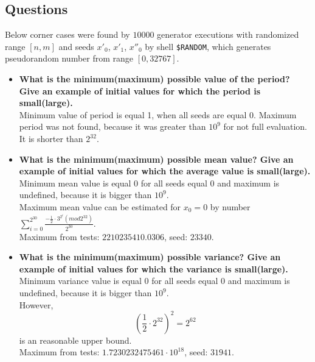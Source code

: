 \documentclass[a4paper,10pt]{article}
\begin{document}
\subsection{Questions}
Below corner cases were found by $10000$ generator executions with randomized range $[n,m]$ and seeds ${x'_0}$, ${x'_1}$, ${x''_0}$ by shell \texttt{\$RANDOM}, which generates pseudorandom number from range $[0,32767]$.
\begin{itemize}
 \item \textbf{What is the minimum(maximum) possible value of the period? Give an example of initial values for which the period is small(large).} \\ 
Minimum value of period is equal 1, when all seeds are equal 0. Maximum period was not found, because it was greater than $10^9$ for not full evaluation. It is shorter than $2^32$.
 \item \textbf{What is the minimum(maximum) possible mean value? Give an example of initial values for which the average value is small(large).} \\
Minimum mean value is equal 0 for all seeds equal 0 and maximum is undefined, because it is bigger than $10^9$. \\
Maximum mean value can be estimated for $x_0 = 0$ by number $\sum_{i=0}^{2^{30}}\frac{-\frac{1}{2} \cdot 3^{2^i}(mod 2^{32})}{2^{30}}$. \\
Maximum from tests: $2210235410.0306$, seed: $23340$.
 \item \textbf{What is the minimum(maximum) possible variance? Give an example of initial values for which the variance is small(large).} \\
Minimum variance value is equal 0 for all seeds equal 0 and maximum is undefined, because it is bigger than $10^9$. \\
However, $$(\frac{1}{2} \cdot 2^{32})^2 = 2^{62}$$ is an reasonable upper bound. \\
Maximum from tests: $1.7230232475461\cdot 10^{18}$, seed: $31941$.


\end{itemize}
\end{document}
